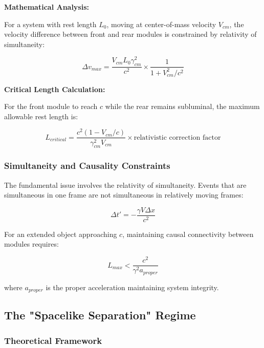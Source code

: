 \documentclass[11pt,a4paper]{article}
\theoremstyle{remark}
\begin{document}
\textbf{Mathematical Analysis:}

For a system with rest length $L_0$, moving at center-of-mass velocity $V_{cm}$, the velocity difference between front and rear modules is constrained by relativity of simultaneity:

\begin{equation}
\Delta v_{max} = \frac{V_{cm} L_0 \gamma_{cm}^2}{c^2} \times \frac{1}{1 + V_{cm}^2/c^2}
\label{eq:velocity_difference_limit}
\end{equation}

\textbf{Critical Length Calculation:}

For the front module to reach $c$ while the rear remains subluminal, the maximum allowable rest length is:

\begin{equation}
L_{critical} = \frac{c^2(1-V_{cm}/c)}{\gamma_{cm}^2 V_{cm}} \times \text{relativistic correction factor}
\label{eq:critical_length}
\end{equation}

\subsubsection{Simultaneity and Causality Constraints}

The fundamental issue involves the relativity of simultaneity. Events that are simultaneous in one frame are not simultaneous in relatively moving frames:

\begin{equation}
\Delta t' = -\frac{\gamma V \Delta x}{c^2}
\label{eq:simultaneity}
\end{equation}

For an extended object approaching $c$, maintaining causal connectivity between modules requires:

\begin{equation}
L_{max} < \frac{c^2}{\gamma^2 a_{proper}}
\label{eq:causal_connectivity_limit}
\end{equation}

where $a_{proper}$ is the proper acceleration maintaining system integrity.

\subsection{The "Spacelike Separation" Regime}

\subsubsection{Theoretical Framework}
\end{document}
